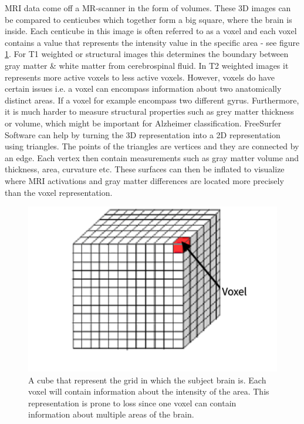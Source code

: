 \documentclass[12pt, fleqn, titlepage]{article}
\begin{document}
MRI data come off a MR-scanner in the form of volumes. These 3D images can be compared to centicubes which together form a big square, where the brain is inside. Each centicube in this image is often referred to as a voxel and each voxel contains a value that represents the intensity value in the specific area - see figure \ref{fig:voxel}. For T1 weighted or structural images this determines the boundary between gray matter \& white matter from cerebrospinal fluid. In T2 weighted images it represents more active voxels to  less active voxels. However, voxels do have certain issues i.e. a voxel can encompass information about two anatomically distinct areas. If a voxel for example encompass two different gyrus. Furthermore, it is much harder to measure structural properties such as grey matter thickness or volume, which might be important for Alzheimer classification. FreeSurfer Software can help by turning the 3D representation into a 2D representation using triangles. The points of the triangles are vertices and they are connected by an edge. Each vertex then contain measurements such as gray matter volume and thickness, area, curvature etc. These surfaces can then be inflated to visualize where MRI activations and gray matter differences are located more precisely than the voxel representation. 

\begin{figure}[H]
	\centering
	\includegraphics[width=0.6\linewidth]{imgs/voxel}
	\caption{A cube that represent the grid in which the subject brain is. Each voxel will contain information about the intensity of the area. This representation is prone to loss since one voxel can contain information about multiple areas of the brain.}
	\label{fig:voxel}
\end{figure}
\end{document}
